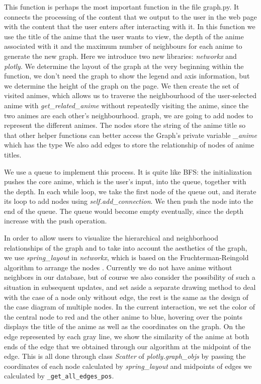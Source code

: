 \documentclass[12pt]{article}
\begin{document}
\begin{enumerate}
\begin{text}
\begin{itemize}
\begin{itemize}
            This function is perhaps the most important function in the file graph.py. It connects the processing of the content that we output to the user in the web page with the content that the user enters after interacting with it. In this function we use the title of the anime that the user wants to view, the depth of the anime associated with it and the maximum number of neighbours for each anime to generate the new graph. Here we introduce two new libraries: \textit{networkx} and \textit{plotly}. We determine the layout of the graph at the very beginning within the function, we don't need the graph to show the legend and axis information, but we determine the height of the graph on the page. We then create the set of visited animes, which allows us to traverse the neighbourhood of the user-selected anime with \textit{get\_related\_anime} without repeatedly visiting the anime, since the two animes are each other's neighbourhood. graph, we are going to add nodes to represent the different animes. The nodes store the string of the anime title so that other helper functions can better access the Graph's private variable \textit{\_anime} which has the type We also add edges to store the relationship of nodes of anime titles.
            
            We use a queue to implement this process. It is quite like BFS: the initialization pushes the core anime, which is the user's input, into the queue, together with the depth. In each while loop, we take the first node of the queue out, and iterate its loop to add nodes using \textit{self.add\_connection}. We then push the node into the end of the queue. The queue would become empty eventually, since the depth increase with the push operation.

            In order to allow users to visualize the hierarchical and neighborhood relationships of the graph and to take into account the aesthetics of the graph, we use \textit{spring\_layout} in \textit{networkx}, which is based on the Fruchterman-Reingold algorithm to arrange the nodes \citep{nxspr}. Currently we do not have anime without neighbors in our database, but of course we also consider the possibility of such a situation in subsequent updates, and set aside a separate drawing method to deal with the case of a node only without edge, the rest is the same as the design of the case diagram of multiple nodes. In the current interaction, we set the color of the central node to red and the other anime to blue, hovering over the points displays the title of the anime as well as the coordinates on the graph. On the edge represented by each gray line, we show the similarity of the anime at both ends of the edge that we obtained through our algorithm at the midpoint of the edge. This is all done through class \textit{Scatter} of \textit{plotly.graph\_objs} by passing the coordinates of each node calculated by \textit{spring\_layout} and midpoints of edges we calculated by \texttt{\_get\_all\_edges\_pos}.
    \end{itemize}


\end{itemize}
\end{text}
\end{enumerate}
\end{document}
